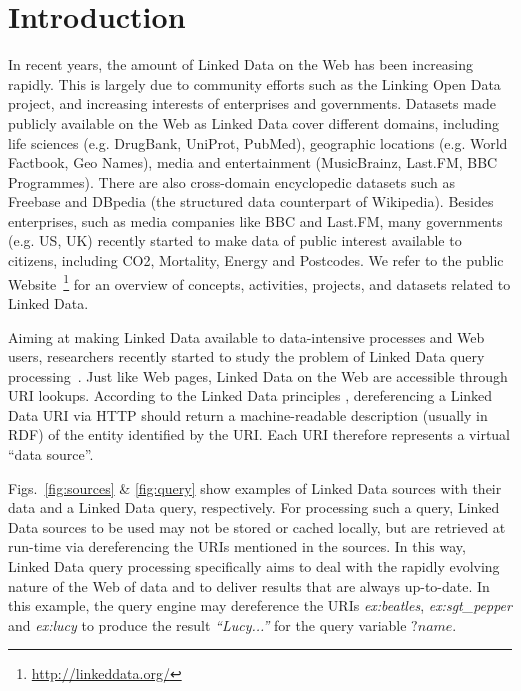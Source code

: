 \section{Introduction}
\label{sec:linked_data} 

In recent years, the amount of Linked Data on the Web has been
increasing rapidly. This is largely due to community efforts such as
the Linking Open Data project, and increasing interests of enterprises
and governments. Datasets made publicly available on the Web as Linked
Data cover different domains, including life sciences (e.g. DrugBank,
UniProt, PubMed), geographic locations (e.g. World Factbook, Geo Names), media and entertainment (MusicBrainz, Last.FM, BBC
Programmes). There are also cross-domain encyclopedic datasets such as
Freebase and DBpedia (the structured data counterpart of
Wikipedia). Besides enterprises, such as media companies like BBC and
Last.FM, many governments (e.g. US, UK) recently started to make data
of public interest available to citizens, including CO2, Mortality,
Energy and Postcodes. We refer to the public
Website~\footnote{\url{http://linkeddata.org/}} for an overview of
concepts, activities, projects, and datasets related to Linked Data.

Aiming at making Linked Data available to
data-intensive processes and Web users, researchers recently started
to study the problem of Linked Data query
processing~\cite{hartig_executing_2009,harth_data_2010,ladwig_linked_2010,hartig_zero_2011,sihjoin_2011}. Just
like Web pages, Linked Data on the Web are accessible through URI
lookups. According to the Linked Data principles
\cite{bizer_linked_2009}, dereferencing a Linked Data URI via HTTP
should return a machine-readable description (usually in RDF) of the
entity identified by the URI. Each URI therefore represents a virtual
``data source''.

Figs.~\ref{fig:sources} \& \ref{fig:query} show examples of Linked
Data sources with their data and a Linked Data query,
respectively. For processing such a query, Linked Data sources to be used may not be stored or cached locally, but
are retrieved at run-time via dereferencing the URIs mentioned in the sources. In this way,
Linked Data query processing specifically aims to deal with the rapidly evolving nature of
the Web of data and to deliver results that are always
up-to-date. In this example, the query engine may dereference the
URIs \emph{ex:beatles}, \emph{ex:sgt\_pepper} and \emph{ex:lucy} to
produce the result \emph{``Lucy...''} for the query variable
$?name$.

